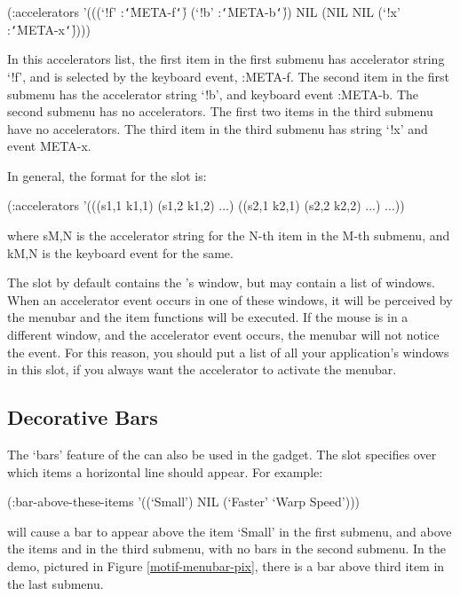\begin{programexample}
(:accelerators '(((`!f' :{\tt\char`\|}META-f{\tt\char`\|}) (`!b' :{\tt\char`\|}META-b{\tt\char`\|}))
		 NIL
		 (NIL NIL (`!x' :{\tt\char`\|}META-x{\tt\char`\|}))))
\end{programexample}

In this accelerators list, the first item in the first submenu has
accelerator string `!f', and is selected by the keyboard event,
:META-f.  The second item in the first submenu has the
accelerator string `!b', and keyboard event :META-b.  The second
submenu has no accelerators.  The first two items in the third submenu
have no accelerators.  The third item in the third submenu has string
`!x' and event META-x.	

In general, the format for the  slot is:

\begin{programexample}
(:accelerators '(((s1,1 k1,1) (s1,2 k1,2) ...)
		 ((s2,1 k2,1) (s2,2 k2,2) ...)
		 ...))
\end{programexample}

where sM,N is the accelerator string for the N-th item in the M-th
submenu, and kM,N is the keyboard event for the same.

The  slot by default contains the 's
window, but may contain a list of windows.  When an accelerator event occurs
in one of these windows, it will be perceived by the menubar and the item
functions will be executed.  If the mouse is in a different window, and the
accelerator event occurs, the menubar will not notice the event.  For this
reason, you should put a list of all your application's windows in this
slot, if you always want the accelerator to activate the menubar.


\subsection{Decorative Bars}

The `bars' feature of the  can also be used in the
 gadget.  The  slot specifies
over which items a horizontal line should appear.  For example:

\begin{programexample}
(:bar-above-these-items '((`Small')
			  NIL
			  (`Faster' `Warp Speed')))
\end{programexample}

will cause a bar to appear above the item `Small' in the first
submenu, and above the items  and  in the third
submenu, with no bars in the second submenu.  In the  demo,
pictured in Figure \ref{motif-menubar-pix}, there is a bar above third item
in the last submenu.


